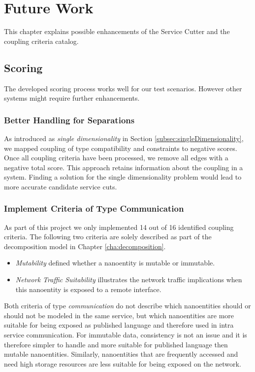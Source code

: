 \chapter{Future Work}
\label{cha:futureWork}

This chapter explains possible enhancements of the Service Cutter and the coupling criteria catalog. %

\section{Scoring}

The developed scoring process works well for our test scenarios. However other systems might require further enhancements.

\subsection{Better Handling for Separations}
\label{sec:handling-for-separations}

As introduced as \textit{single dimensionality} in Section \ref{subsec:singleDimensionality}, we mapped coupling of type compatibility and constraints to negative scores. Once all coupling criteria have been processed, we remove all edges with a negative total score. This approach retains information about the coupling in a system. Finding a solution for the single dimensionality problem would lead to more accurate candidate service cuts.

\subsection{Implement Criteria of Type Communication}

As part of this project we only implemented 14 out of 16 identified coupling criteria. The following two criteria are solely described as part of the decomposition model in Chapter \ref{cha:decomposition}.

\begin{itemize}
\item \textit{Mutability} defined whether a nanoentity is mutable or immutable.
\item \textit{Network Traffic Suitability} illustrates the network traffic implications when this nanoentity is exposed to a remote interface.
\end{itemize}

Both criteria of type \textit{communication} do not describe which nanoentities should or should not be modeled in the same service, but which nanoentities are more suitable for being exposed as published language and therefore used in intra service communication. For immutable data, consistency is not an issue and it is therefore simpler to handle and more suitable for published language then mutable nanoentities. Similarly, nanoentities that are frequently accessed and need high storage resources are less suitable for being exposed on the network. 

